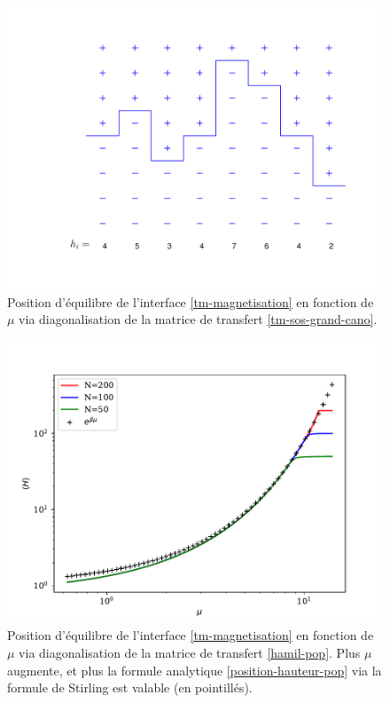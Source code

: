 \begin{figure}[h]
	\centering
	\includegraphics[width=0.7\linewidth]{isingtosos/figure-sos.pdf}
	\caption{Position d'équilibre de l'interface \ref{tm-magnetisation} en fonction de $\mu$ via diagonalisation de la matrice de transfert \ref{tm-sos-grand-cano}.}
	\label{figure-pop}
\end{figure}	
\begin{figure}
	\centering
	\includegraphics[width=0.5\linewidth]{isingtosos/hauteur-tm-pop.pdf}
	\caption{Position d'équilibre de l'interface \ref{tm-magnetisation} en fonction de $\mu$ via diagonalisation de la matrice de transfert \ref{hamil-pop}. Plus $\mu$ augmente, et plus la formule analytique \ref{position-hauteur-pop} via la formule de Stirling est valable (en pointillés).}
	\label{figure-pop}
\end{figure}
	

